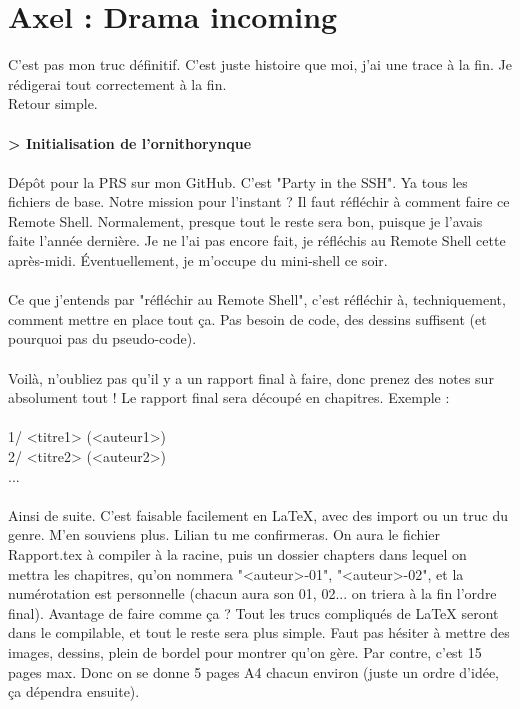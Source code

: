 
\chapter[Axel]{Axel : Drama incoming}

C'est pas mon truc définitif. C'est juste histoire que moi, j'ai une trace à la fin. Je rédigerai tout correctement à la fin.
\\Retour simple.
\\\\
\textbf{> Initialisation de l'ornithorynque}
\\\\
Dépôt pour la PRS sur mon GitHub. C'est "Party in the SSH". Ya tous les fichiers de base. Notre mission pour l'instant ? Il faut réfléchir à comment faire ce Remote Shell.
Normalement, presque tout le reste sera bon, puisque je l'avais faite l'année dernière. Je ne l'ai pas encore fait, je réfléchis au Remote Shell cette après-midi. Éventuellement, je m'occupe du mini-shell ce soir.
\\\\
Ce que j'entends par "réfléchir au Remote Shell", c'est réfléchir à, techniquement, comment mettre en place tout ça. Pas besoin de code, des dessins suffisent (et pourquoi pas du pseudo-code).
\\\\
Voilà, n'oubliez pas qu'il y a un rapport final à faire, donc prenez des notes sur absolument tout ! Le rapport final sera découpé en chapitres. Exemple :
\\\\
1/ <titre1> (<auteur1>)
\\2/ <titre2> (<auteur2>)
\\...
\\\\
Ainsi de suite. C'est faisable facilement en LaTeX, avec des import ou un truc du genre. M'en souviens plus. Lilian tu me confirmeras. On aura le fichier Rapport.tex à compiler à la racine, puis un dossier chapters dans lequel on mettra les chapitres, qu'on nommera "<auteur>-01", "<auteur>-02", et la numérotation est personnelle (chacun aura son 01, 02... on triera à la fin l'ordre final). Avantage de faire comme ça ? Tout les trucs compliqués de LaTeX seront dans le compilable, et tout le reste sera plus simple. Faut pas hésiter à mettre des images, dessins, plein de bordel pour montrer qu'on gère. Par contre, c'est 15 pages max. Donc on se donne 5 pages A4 chacun environ (juste un ordre d'idée, ça dépendra ensuite).
\\\\
